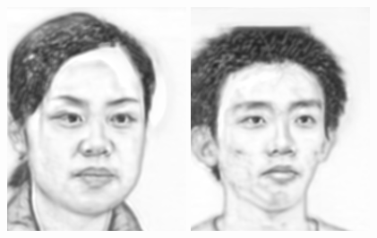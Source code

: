 \documentclass[10pt,twocolumn,letterpaper]{article}
\begin{document}
\begin{figure}[htbp]
{\begin{minipage}[b]{0.22\linewidth}
\includegraphics[width=0.99\linewidth]{img/light&pose_invariance/bfcn_p1.png}
\includegraphics[width=0.99\linewidth]{img/light&pose_invariance/bfcn_p2.png}

\end{minipage}}
\end{figure}
\end{document}
